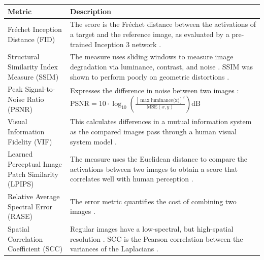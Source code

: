 \documentclass[pdflatex,sn-mathphys-num]{sn-jnl}%
\theoremstyle{thmstyleone}%
\theoremstyle{thmstyletwo}%
\theoremstyle{thmstylethree}%
\begin{document}
\begin{table}[ht]
    \centering
    \begin{tabularx}{\textwidth}{p{4cm} X}
        \toprule
        \textbf{Metric} & \textbf{Description} \\
        \midrule

        Fréchet Inception Distance (FID) & The score is the Fréchet distance between the activations of a target and the reference image, as evaluated by a pre-trained Inception 3 network \cite{heusel_gans_2018}. \\
        
        \midrule
        
        Structural Similarity Index Measure (SSIM) & The measure uses sliding windows to measure image degradation via luminance, contrast, and noise \cite{wang_image_2004}. SSIM was shown to perform poorly on geometric distortions \cite{zhang_unreasonable_2018}. \\
        
        \midrule
        
        Peak Signal-to-Noise Ratio (PSNR) & Expresses the difference in noise between two images \cite{huynh-thu_accuracy_2012}: $\text{PSNR} = 10 \cdot \log_{10} \left( \frac{[\max \text{luminance(x)}]^2}{\text{MSE}(x, y)} \right) \text{dB}$ \\
        
        \midrule
        
        Visual Information Fidelity (VIF) & This calculates differences in a mutual information system as the compared images pass through a human visual system model \cite{sheikh_image_2006}. \\
        
        \midrule
        
        Learned Perceptual Image Patch Similarity (LPIPS) & The measure uses the Euclidean distance to compare the activations between two images to obtain a score that correlates well with human perception \cite{zhang_unreasonable_2018}. \\
        
        \midrule
        
        Relative Average Spectral Error (RASE) & The error metric quantifies the cost of combining two images \cite{wald_data_2002}. \\
        
        \midrule
        
        Spatial Correlation Coefficient (SCC) & Regular images have a low-spectral, but high-spatial resolution \cite{chen_new_2015}. SCC is the Pearson correlation between the variances of the Laplacians \cite{zhou_wavelet_1998}. \\
        

\end{tabularx}
\end{table}
\end{document}
